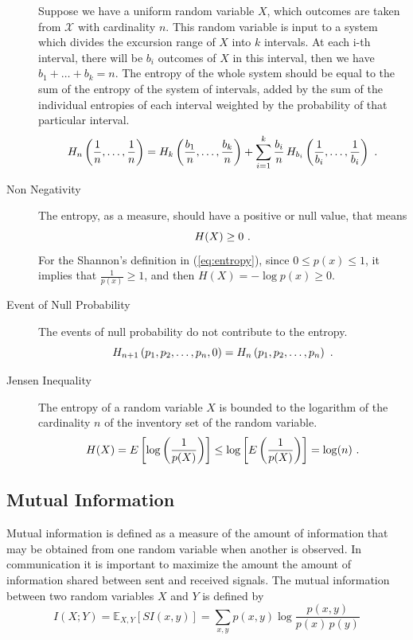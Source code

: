 \begin{description}
Suppose we have a uniform random variable $X$, which outcomes are taken from $\mathcal{X}$ with cardinality $n$. 
This random variable is input to a system which divides the excursion range of $X$ into $k$ intervals. 
At each i-th interval, there will be $b_i$ outcomes of $X$ in this interval, then we have $b_1 + \ldots + b_k = n$. 
The entropy of the whole system should be equal to the sum of the entropy of the system of intervals, 
added by the sum of the individual entropies of each interval weighted by the probability of that particular interval.
\begin{equation}
H_n\left(\frac{1}{n}, \ldots, \frac{1}{n}\right) = H_k\left(\frac{b_1}{n}, \ldots, \frac{b_k}{n}\right) + \sum_{i=1}^k \frac{b_i}{n} \, H_{b_i}\left(\frac{1}{b_i}, \ldots, \frac{1}{b_i}\right) \textmd{ .}
\label{eq:entropy-additivity}
\end{equation}

\item[Non Negativity]
The entropy, as a measure, should have a positive or null value, that means
\begin{equation}
H(X) \geq 0 \textmd{ .}
\label{eq:entropy-non-negativity}
\end{equation}
For the Shannon's definition in (\ref{eq:entropy}), since $0 \leq p(x) \leq 1$, 
it implies that $\frac{1}{p(x)} \geq 1$, and then $H(X) = - \log p(x) \geq 0$.

\item[Event of Null Probability]
The events of null probability do not contribute to the entropy.
\begin{equation}
H_{n+1}\left(p_1, p_2, \ldots, p_n, 0 \right) = H_{n}\left(p_1, p_2, \ldots, p_n \right) \textmd{ .}
\label{eq:entropy-null-event}
\end{equation}

\item[Jensen Inequality]
The entropy of a random variable $X$ is bounded to the logarithm of the cardinality $n$ of 
the inventory set of the random variable.
\begin{equation}
H(X) = E \left[ \log \left( \frac{1}{p(X)} \right) \right] \leq 
\log \left[ E \left( \frac{1}{p(X)} \right) \right] = \log (n) \textmd{ .}
\label{eq:entropy-jensen}
\end{equation}

\end{description}



\subsection{Mutual Information}
Mutual information is defined as a measure of the amount of information that may be obtained from one random
variable when another is observed. In communication it is important to maximize the amount the amount
of information shared between sent and received signals. The mutual information between two
random variables $X$ and $Y$ is defined by
\begin{equation}
I(X;Y) = \mathbb{E}_{X,Y} [SI(x,y)] = \sum_{x,y} p(x,y) \log \frac{p(x,y)}{p(x)\, p(y)}
\end{equation}

